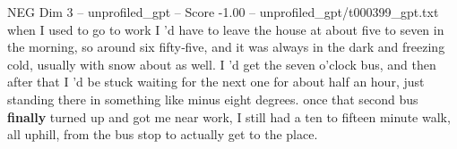 \begin{textsample}{NEG Dim 3 – unprofiled\_gpt – Score -1.00 – unprofiled\_gpt/t000399\_gpt.txt}  \label{ex:f3_neg_007}
when I used to go to work I ’d have to leave the house at about five to seven in the morning, so around six fifty‑five, and it was always in the dark and freezing cold, usually with snow about as well.
I ’d get the seven o’clock bus, and then after that I ’d be stuck waiting for the next one for about half an hour, just standing there in something like minus eight degrees. once that second bus \textbf{finally} turned up and got me near work, I still had a ten to fifteen minute walk, all uphill, from the bus stop to actually get to the place.

\end{textsample}
